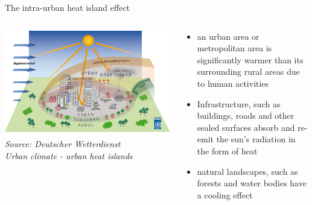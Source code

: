 \begin{frame}{The intra-urban heat island effect}
	\begin{columns}[T] %
		\begin{column}{.52\textwidth}
			\includegraphics[width=\linewidth]{../writeup/images/urbanheatisland_01.png}\\
			\textit{\footnotesize Source: Deutscher Wetterdienst\\Urban climate - urban heat islands}
		\end{column}%
		\hfill%
		\begin{column}{.48\textwidth}
			\begin{itemize}
				\item \glqq{}{[\textellipsis]} an urban area or metropolitan area is significantly warmer than its surrounding rural areas due to human activities\grqq{}\cite{takebayashi_chapter_2020}
				\item Infrastructure, such as buildings, roads and other sealed surfaces absorb and re-emit the sun's radiation in the form of heat
				\item natural landscapes, such as forests and water bodies have a cooling effect\cite{us_epa_learn_2014}
			\end{itemize}
		\end{column}%
	\end{columns}
\end{frame}
